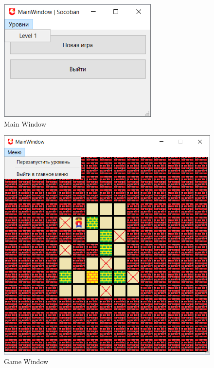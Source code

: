 \newpage

\begin{figure}[!hp]
    \centering
    \includegraphics[width=8cm]
    {_assets/gpi_MainWindow.png}
    \caption{Main Window}
\end{figure}

\begin{figure}[!hp]
    \centering
    \includegraphics[width=12cm]
    {_assets/gpi_GameWindow.png}
    \caption{Game Window}
\end{figure}

\newpage

